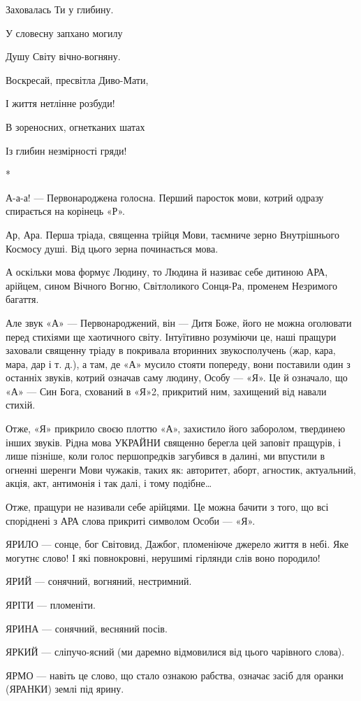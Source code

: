 Заховалась Ти у глибину.

У словесну запхано могилу

Душу Світу вічно-вогняну.

Воскресай, пресвітла Диво-Мати,

І життя нетлінне розбуди!

В зореносних, огнетканих шатах

Із глибин незмірності гряди!

*

А-а-а! — Первонароджена голосна. Перший паросток мови, котрий одразу спирається
на корінець «Р».

Ар, Ара. Перша тріада, священна трійця Мови, таємниче зерно Внутрішнього
Космосу душі. Від цього зерна починається мова.

А оскільки мова формує Людину, то Людина й називає себе дитиною АРА, арійцем,
сином Вічного Вогню, Світлоликого Сонця-Ра, променем Незримого багаття.

Але звук «А» — Первонароджений, він — Дитя Боже, його не можна оголювати перед
стихіями ще хаотичного світу. Інтуїтивно розуміючи це, наші пращури заховали
священну тріаду в покривала вторинних звукосполучень (жар, кара, мара, дар і т.
д.), а там, де «А» мусило стояти попереду, вони поставили один з останніх
звуків, котрий означав саму людину, Особу — «Я». Це й означало, що «А» — Син
Бога, схований в «Я»2, прикритий ним, захищений від навали стихій.

Отже, «Я» прикрило своєю плоттю «А», захистило його заборолом, твердинею інших
звуків. Рідна мова УКРАЙНИ священно берегла цей заповіт пращурів, і лише
пізніше, коли голос першопредків загубився в далині, ми впустили в огненні
шеренги Мови чужаків, таких як: авторитет, аборт, агностик, актуальний, акція,
акт, антимонія і так далі, і тому подібне…

Отже, пращури не називали себе арійцями. Це можна бачити з того, що всі
споріднені з АРА слова прикриті символом Особи — «Я».

ЯРИЛО — сонце, бог Світовид, Дажбог, пломеніюче джерело життя в небі. Яке
могутнє слово! І які повнокровні, нерушимі гірлянди слів воно породило!

ЯРИЙ — сонячний, вогняний, нестримний.

ЯРІТИ — пломеніти.

ЯРИНА — сонячний, весняний посів.

ЯРКИЙ — сліпучо-ясний (ми даремно відмовилися від цього чарівного слова).

ЯРМО — навіть це слово, що стало ознакою рабства, означає засіб для оранки
(ЯРАНКИ) землі під ярину.


